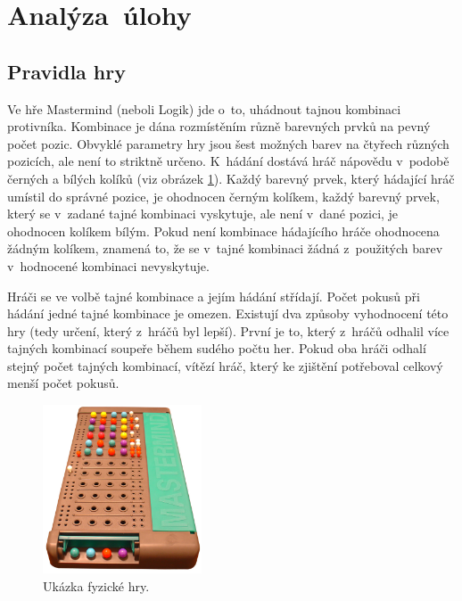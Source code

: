 \documentclass[12pt, a4paper]{article}
\begin{document}
\section{Analýza~úlohy} %

\subsection{Pravidla hry}

Ve hře Mastermind (neboli Logik) jde o~to, uhádnout tajnou kombinaci protivníka. Kombinace je dána rozmístěním různě barevných prvků na pevný počet pozic. Obvyklé parametry hry jsou šest možných barev na čtyřech různých pozicích, ale není to striktně určeno. K~hádání dostává hráč nápovědu v~podobě černých a bílých kolíků (viz obrázek \ref{fig:game}). Každý barevný prvek, který hádající hráč umístil do správné pozice, je ohodnocen černým kolíkem, každý barevný prvek, který se v~zadané tajné kombinaci vyskytuje, ale není v~dané pozici, je ohodnocen kolíkem bílým. Pokud není kombinace hádajícího hráče ohodnocena žádným kolíkem, znamená to, že se v~tajné kombinaci žádná z~použitých barev v~hodnocené kombinaci nevyskytuje. 

Hráči se ve volbě tajné kombinace a jejím hádání střídají. Počet pokusů při hádání jedné tajné kombinace je omezen. Existují dva způsoby vyhodnocení této hry (tedy určení, který z~hráčů byl lepší). První je to, který z~hráčů odhalil více tajných kombinací soupeře během sudého počtu her. Pokud oba hráči odhalí stejný počet tajných kombinací, vítězí hráč, který ke zjištění potřeboval celkový menší počet pokusů. 

\begin{figure}[ht]
\centering
\includegraphics[bb= 0 0 600 637 , height=5cm]{game.jpg}
\caption{Ukázka fyzické hry.}
\label{fig:game}
\end{figure}
\end{document}
